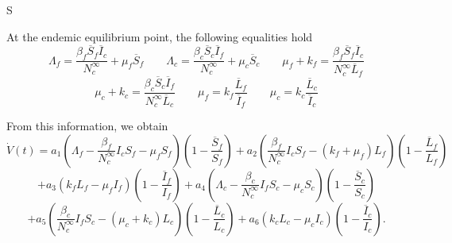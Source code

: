 S\documentclass[preprint,12pt]{elsarticle}
\begin{document}
\noindent At the endemic equilibrium point, the following equalities hold
$$\Lambda_f=\frac{\beta_f\overline{S}_f\overline{I}_c}{N_c^{\infty}}+\mu_f\overline{S}_f \qquad \Lambda_c=\frac{\beta_c\overline{S}_c\overline{I}_f}{N_c^{\infty}}+\mu_c\overline{S}_c \qquad \mu_f+k_f=\frac{\beta_f\overline{S}_f\overline{I}_c}{N_c^{\infty}\overline{L}_f}$$
\begin{equation}\label{endemic_equalities}
\mu_c+k_c=\frac{\beta_c\overline{S}_c\overline{I}_f}{N_c^{\infty}\overline{L}_c} \qquad \mu_f=k_f\frac{\overline{L}_f}{\overline{I}_f} \qquad \mu_c= k_c\frac{\overline{L}_c}{\overline{I}_c}
\end{equation}

\noindent From this information, we obtain 
$$\dot{V}(t)=a_1\left(\Lambda_f-\frac{\beta_f}{N_c^{\infty}}I_cS_f-\mu_fS_f\right)\left(1-\frac{\overline{S}_f}{S_f}\right)+a_2\left(\frac{\beta_f}{N_c^{\infty}}I_cS_f-\left(k_f+\mu_f\right)L_f\right)\left(1-\frac{\overline{L}_f}{L_f}\right)$$
$$+a_3\left(k_f L_f-\mu_fI_f\right)\left(1-\frac{\overline{I}_f}{I_f}\right)+a_4\left(\Lambda_c-\frac{\beta_c}{N_c^{\infty}}I_fS_c-\mu_cS_c\right)\left(1-\frac{\overline{S}_c}{S_c}\right)$$
$$+a_5\left(\frac{\beta_c}{N_c^{\infty}}I_fS_c-\left(\mu_c+k_c\right)L_c\right)\left(1-\frac{\overline{L}_c}{L_c}\right)+a_6\left(k_c L_c-\mu_cI_c\right)\left(1-\frac{\overline{I}_c}{I_c}\right).$$
\end{document}
